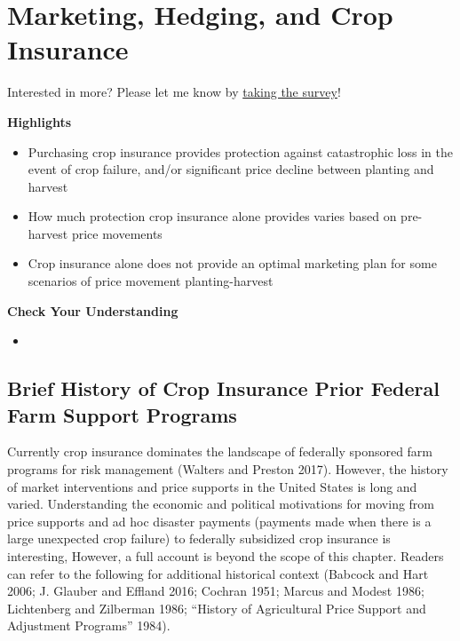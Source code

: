 \documentclass[
  letterpaper,
  DIV=11,
  numbers=noendperiod]{scrreprt}
\providecommand{\tightlist}{%
  \setlength{\itemsep}{0pt}\setlength{\parskip}{0pt}}\usepackage{longtable,booktabs,array}
\begin{document}

\hypertarget{marketing-hedging-and-crop-insurance}{%
\chapter{Marketing, Hedging, and Crop
Insurance}\label{marketing-hedging-and-crop-insurance}}

{Interested in more? Please let me know by}
\href{https://forms.gle/Q3VByCQZHjfQSy9D7}{taking the survey}!

\textbf{Highlights}

\begin{itemize}
\tightlist
\item
  Purchasing crop insurance provides protection against catastrophic
  loss in the event of crop failure, and/or significant price decline
  between planting and harvest
\item
  How much protection crop insurance alone provides varies based on
  pre-harvest price movements
\item
  Crop insurance alone does not provide an optimal marketing plan for
  some scenarios of price movement planting-harvest
\end{itemize}

\textbf{Check Your Understanding}

\begin{itemize}
\tightlist
\item
\end{itemize}

\hypertarget{brief-history-of-crop-insurance-prior-federal-farm-support-programs}{%
\section{Brief History of Crop Insurance Prior Federal Farm Support
Programs}\label{brief-history-of-crop-insurance-prior-federal-farm-support-programs}}

Currently crop insurance dominates the landscape of federally sponsored
farm programs for risk management (Walters and Preston 2017). However,
the history of market interventions and price supports in the United
States is long and varied. Understanding the economic and political
motivations for moving from price supports and ad hoc disaster payments
(payments made when there is a large unexpected crop failure) to
federally subsidized crop insurance is interesting, However, a full
account is beyond the scope of this chapter. Readers can refer to the
following for additional historical context (Babcock and Hart 2006; J.
Glauber and Effland 2016; Cochran 1951; Marcus and Modest 1986;
Lichtenberg and Zilberman 1986; {``History of Agricultural Price Support
and Adjustment Programs''} 1984).
\end{document}

